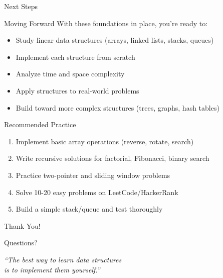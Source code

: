 \documentclass[aspectratio=169,xcolor=dvipsnames]{beamer}
\begin{document}
\begin{frame}{Next Steps}
  \begin{block}{Moving Forward}
    With these foundations in place, you're ready to:
    \begin{itemize}
      \item Study linear data structures (arrays, linked lists, stacks, queues)
      \item Implement each structure from scratch
      \item Analyze time and space complexity
      \item Apply structures to real-world problems
      \item Build toward more complex structures (trees, graphs, hash tables)
    \end{itemize}
  \end{block}

  \vspace{0.5cm}

  \begin{exampleblock}{Recommended Practice}
    \begin{enumerate}
      \item Implement basic array operations (reverse, rotate, search)
      \item Write recursive solutions for factorial, Fibonacci, binary search
      \item Practice two-pointer and sliding window problems
      \item Solve 10-20 easy problems on LeetCode/HackerRank
      \item Build a simple stack/queue and test thoroughly
    \end{enumerate}
  \end{exampleblock}
\end{frame}

\begin{frame}[plain]
  \begin{center}
    {\Huge Thank You!}

    \vspace{1cm}

    {\large Questions?}

    \vspace{1cm}

    \textit{``The best way to learn data structures \\
    is to implement them yourself.''}
  \end{center}
\end{frame}
\end{document}
